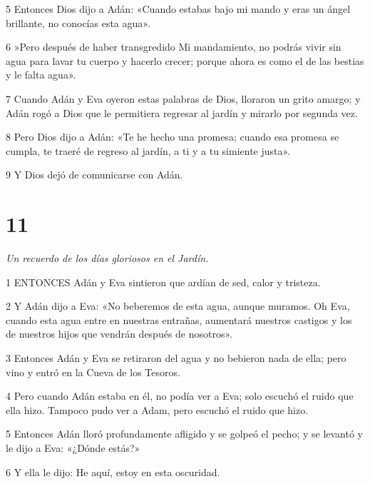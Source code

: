 \par 5 Entonces Dios dijo a Adán: «Cuando estabas bajo mi mando y eras un ángel brillante, no conocías esta agua».

\par 6 »Pero después de haber transgredido Mi mandamiento, no podrás vivir sin agua para lavar tu cuerpo y hacerlo crecer; porque ahora es como el de las bestias y le falta agua».

\par 7 Cuando Adán y Eva oyeron estas palabras de Dios, lloraron un grito amargo; y Adán rogó a Dios que le permitiera regresar al jardín y mirarlo por segunda vez.

\par 8 Pero Dios dijo a Adán: «Te he hecho una promesa; cuando esa promesa se cumpla, te traeré de regreso al jardín, a ti y a tu simiente justa».

\par 9 Y Dios dejó de comunicarse con Adán.

\chapter{11}

\par \textit{Un recuerdo de los días gloriosos en el Jardín.}

\par 1 ENTONCES Adán y Eva sintieron que ardían de sed, calor y tristeza.

\par 2 Y Adán dijo a Eva: «No beberemos de esta agua, aunque muramos. Oh Eva, cuando esta agua entre en nuestras entrañas, aumentará nuestros castigos y los de nuestros hijos que vendrán después de nosotros».

\par 3 Entonces Adán y Eva se retiraron del agua y no bebieron nada de ella; pero vino y entró en la Cueva de los Tesoros.

\par 4 Pero cuando Adán estaba en él, no podía ver a Eva; solo escuchó el ruido que ella hizo. Tampoco pudo ver a Adam, pero escuchó el ruido que hizo.

\par 5 Entonces Adán lloró profundamente afligido y se golpeó el pecho; y se levantó y le dijo a Eva: «¿Dónde estás?»

\par 6 Y ella le dijo: He aquí, estoy en esta oscuridad.

